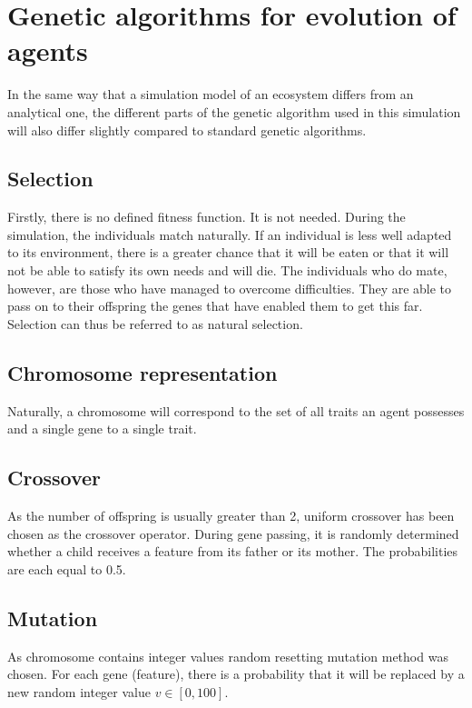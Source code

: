 \chapter{Genetic algorithms for evolution of agents}
\label{geneticAlgorithmsChapter}
In the same way that a simulation model of an ecosystem differs from an analytical one, the different parts of the genetic algorithm used in this simulation will also differ slightly compared to standard genetic algorithms.

\section{Selection}
Firstly, there is no defined fitness function. It is not needed. During the simulation, the individuals match naturally. If an individual is less well adapted to its environment, there is a greater chance that it will be eaten or that it will not be able to satisfy its own needs and will die. The individuals who do mate, however, are those who have managed to overcome difficulties. They are able to pass on to their offspring the genes that have enabled them to get this far. Selection can thus be referred to as natural selection.

\section{Chromosome representation}
Naturally, a chromosome will correspond to the set of all traits an agent possesses and a single gene to a single trait.

\section{Crossover}
As the number of offspring is usually greater than 2, uniform crossover has been chosen as the crossover operator. During gene passing, it is randomly determined whether a child receives a feature from its father or its mother. The probabilities are each equal to 0.5.

\section{Mutation}
As chromosome contains integer values random resetting mutation method was chosen. For each gene (feature), there is a probability that it will be replaced by a new random integer value $v \in [0, 100]$.